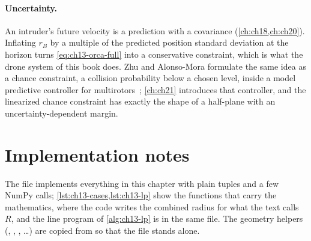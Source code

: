\paragraph{Uncertainty.}
An intruder's future velocity is a prediction with a covariance
(\cref{ch:ch18,ch:ch20}). Inflating $r_B$ by a multiple of the predicted
position standard deviation at the horizon turns \cref{eq:ch13-orca-full}
into a conservative constraint, which is what the drone system of this book
does. Zhu and Alonso-Mora formulate the same idea as a chance constraint,
a collision probability below a chosen level, inside a model predictive
controller for multirotors~\cite{zhu2019chance}; \cref{ch:ch21} introduces
that controller, and the linearized chance constraint has exactly the shape
of a half-plane with an uncertainty-dependent margin.

\section{Implementation notes}
\label{sec:ch13-implementation}

The file  implements everything in this chapter with
plain tuples and a few NumPy calls; \cref{lst:ch13-cases,lst:ch13-lp}
show the functions that carry the mathematics, where the code writes the
combined radius  for what the text calls $R$, and the line program of
\cref{alg:ch13-lp} is  in the same file. The geometry helpers
(, , , \dots) are
copied from  so that the file stands alone.

